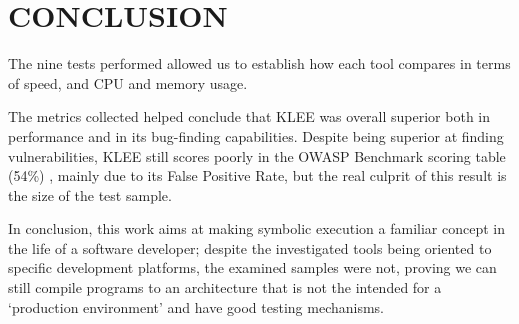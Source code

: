 \section{CONCLUSION}\label{chap:conclusion}

The nine tests performed allowed us to establish how each tool compares in terms of speed, and CPU and memory usage.



The metrics collected helped conclude that KLEE was overall superior both in performance and in its bug-finding capabilities. Despite being superior at finding vulnerabilities, KLEE still scores poorly in the OWASP Benchmark scoring table (54\%) \cite{owasp_benchmark_scoring}, mainly due to its False Positive Rate, but the real culprit of this result is the size of the test sample.

In conclusion, this work aims at making symbolic execution a familiar concept in the life of a software developer; despite the investigated tools being oriented to specific development platforms, the examined samples were not, proving we can still compile programs to an architecture that is not the intended for a `production environment' and have good testing mechanisms.



